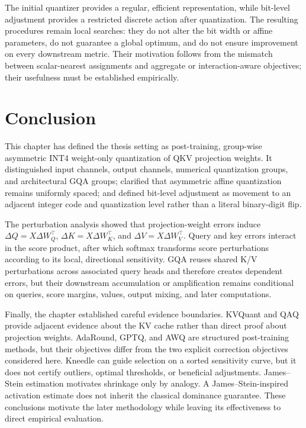 The initial quantizer provides a regular, efficient representation, while bit-level adjustment provides a restricted discrete action after quantization. The resulting procedures remain local searches: they do not alter the bit width or affine parameters, do not guarantee a global optimum, and do not ensure improvement on every downstream metric. Their motivation follows from the mismatch between scalar-nearest assignments and aggregate or interaction-aware objectives; their usefulness must be established empirically.

\section*{Conclusion}

This chapter has defined the thesis setting as post-training, group-wise asymmetric INT4 weight-only quantization of QKV projection weights. It distinguished input channels, output channels, numerical quantization groups, and architectural GQA groups; clarified that asymmetric affine quantization remains uniformly spaced; and defined bit-level adjustment as movement to an adjacent integer code and quantization level rather than a literal binary-digit flip.

The perturbation analysis showed that projection-weight errors induce $\Delta Q=X\Delta W_Q^\top$, $\Delta K=X\Delta W_K^\top$, and $\Delta V=X\Delta W_V^\top$. Query and key errors interact in the score product, after which softmax transforms score perturbations according to its local, directional sensitivity. GQA reuses shared K/V perturbations across associated query heads and therefore creates dependent errors, but their downstream accumulation or amplification remains conditional on queries, score margins, values, output mixing, and later computations.

Finally, the chapter established careful evidence boundaries. KVQuant and QAQ provide adjacent evidence about the KV cache rather than direct proof about pro\-jection weights. AdaRound, GPTQ, and AWQ are structured post-training methods, but their objectives differ from the two explicit correction objectives considered here. Kneedle can guide selection on a sorted sensitivity curve, but it does not certify outliers, optimal thresholds, or beneficial adjustments. James--Stein estimation motivates shrinkage only by analogy. A James--Stein-inspired activation estimate does not inherit the classical dominance guarantee. These conclusions motivate the later methodology while leaving its effectiveness to direct empirical evaluation.
